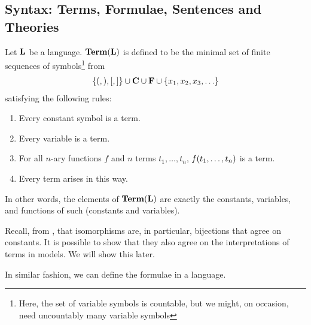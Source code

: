 \subsection{Syntax: Terms, Formulae, Sentences and Theories}

\begin{boxdefinition}[Terms]\label{Ch1:Def:Term}
    Let $\mathbf{L}$ be a language. $\mathbf{Term}(\mathbf{L})$ is defined to be the minimal set of finite sequences of symbols\footnote{Here, the set of variable symbols is countable, but we might, on occasion, need uncountably many variable symbols} from
    \begin{align*}
        \left\{ (, ), [, ] \right\} \cup \mathbf{C} \cup \mathbf{F} \cup \left\{ x_1, x_2, x_3, \ldots \right\}
    \end{align*}
    satisfying the following rules:
    \begin{enumerate}
        \item Every constant symbol is a term.
        \item Every variable is a term.
        \item For all $n$-ary functions $f$ and $n$ terms $t_1, \ldots, t_n$, $f\!\left( t_1, \ldots, t_n \right)$ is a term.
        \item Every term arises in this way.
    \end{enumerate}
\end{boxdefinition}
\begin{remark}%
    In other words, the elements of $\mathbf{Term}(\mathbf{L})$ are exactly the constants, variables, and functions of such (constants and variables).
\end{remark}

Recall, from , that isomorphisms are, in particular, bijections that agree on constants. It is possible to show that they also agree on the interpretations of terms in models. We will show this later.


In similar fashion, we can define the formulae in a language.

